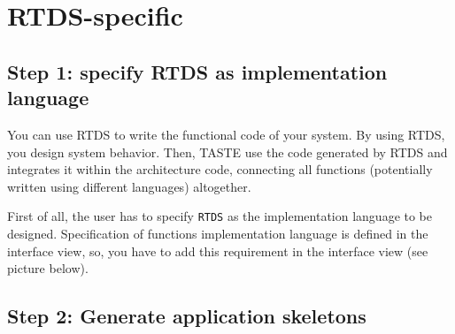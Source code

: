 \documentclass[11pt]{book}
\begin{document}
%
%
%
%
%
%
   \section{RTDS-specific}
   \subsection{Step 1: specify RTDS as implementation language}
   You can use RTDS to write the functional code of your system. By using RTDS,
   you design system behavior. Then, TASTE use the code generated by RTDS and
   integrates it within the architecture code, connecting all functions
   (potentially written using different languages) altogether.

   First of all, the user has to specify \texttt{RTDS} as the implementation
   language to be designed. Specification of functions implementation language
   is defined in the interface view, so, you have to add this requirement in the
   interface view (see picture below).


   \centerline{}

   \subsection{Step 2: Generate application skeletons}
\end{document}
